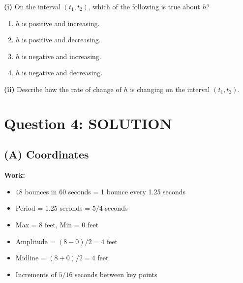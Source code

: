 \documentclass[11pt]{article}
\begin{document}
\textbf{(i)} On the interval $(t_1, t_2)$, which of the following is true about $h$?

\begin{enumerate}[label=\alph*., leftmargin=1.5cm]
    \item $h$ is positive and increasing.
    \item $h$ is positive and decreasing.
    \item $h$ is negative and increasing.
    \item $h$ is negative and decreasing.
\end{enumerate}

\vspace{0.5cm}
\textbf{(ii)} Describe how the rate of change of $h$ is changing on the interval $(t_1, t_2)$.

\newpage

\section*{Question 4: SOLUTION}

\subsection*{(A) Coordinates}

\textbf{Work:}
\begin{itemize}[noitemsep]
    \item 48 bounces in 60 seconds = 1 bounce every 1.25 seconds
    \item Period = 1.25 seconds = $5/4$ seconds
    \item Max = 8 feet, Min = 0 feet
    \item Amplitude = $(8 - 0)/2 = 4$ feet
    \item Midline = $(8 + 0)/2 = 4$ feet
    \item Increments of $5/16$ seconds between key points
\end{itemize}

\begin{center}
\end{center}
\end{document}
